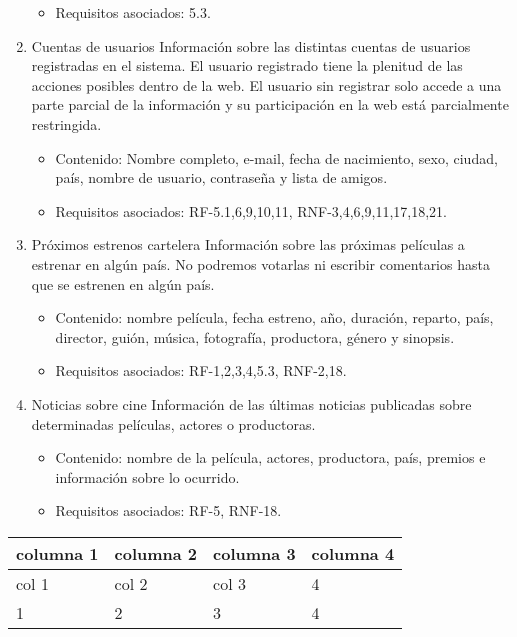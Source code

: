 \documentclass{article}
\begin{document}
\begin{enumerate}[label=\bfseries RI- \arabic*:]
\begin{itemize}
        \item Requisitos asociados: 5.3.
        \end{itemize}
    \item Cuentas de usuarios Información sobre las distintas cuentas de usuarios registradas en el sistema. El usuario registrado tiene la plenitud de las acciones posibles dentro de la web. El usuario sin registrar solo accede a una parte parcial de la información y su participación en la web está parcialmente restringida.
        \begin{itemize}
        \item Contenido: Nombre completo, e-mail, fecha de nacimiento, sexo, ciudad, país, nombre de usuario, contraseña y lista de amigos.

        \item Requisitos asociados: RF-5.1,6,9,10,11, RNF-3,4,6,9,11,17,18,21.
        \end{itemize}
    \item Próximos estrenos cartelera Información sobre las próximas películas a estrenar en algún país. No podremos votarlas ni escribir comentarios hasta que se estrenen en algún país.
        \begin{itemize}
        \item Contenido: nombre película, fecha estreno, año, duración, reparto, país, director, guión, música, fotografía, productora, género y sinopsis.

        \item Requisitos asociados: RF-1,2,3,4,5.3, RNF-2,18.
        \end{itemize}
    \item Noticias sobre cine Información de las últimas noticias publicadas sobre determinadas películas, actores o productoras.
        \begin{itemize}
        \item Contenido: nombre de la película, actores, productora, país, premios e información sobre lo ocurrido.

        \item Requisitos asociados: RF-5, RNF-18.
        \end{itemize}
    \end{enumerate}



\begin{tabular}{||l | l | l | l ||}
\hline
\hline
columna 1 & columna 2 & columna 3 & columna 4\\
\hline
col 1 & col 2 & col 3 & 4\\
\hline
1 & 2 & 3 & 4\\
\hline
\hline
\end{tabular}
\end{document}
